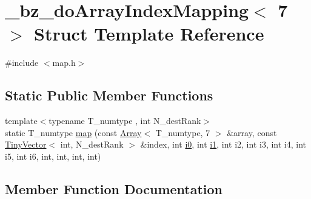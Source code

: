 \hypertarget{struct__bz__doArrayIndexMapping_3_017_01_4}{}\section{\+\_\+bz\+\_\+do\+Array\+Index\+Mapping$<$ 7 $>$ Struct Template Reference}
\label{struct__bz__doArrayIndexMapping_3_017_01_4}


{\ttfamily \#include $<$map.\+h$>$}

\subsection*{Static Public Member Functions}
\begin{DoxyCompactItemize}
\item 
{\footnotesize template$<$typename T\+\_\+numtype , int N\+\_\+dest\+Rank$>$ }\\static T\+\_\+numtype \hyperlink{struct__bz__doArrayIndexMapping_3_017_01_4_a9e91325248934553ee2462834711a629}{map} (const \hyperlink{classArray}{Array}$<$ T\+\_\+numtype, 7 $>$ \&array, const \hyperlink{classTinyVector}{Tiny\+Vector}$<$ int, N\+\_\+dest\+Rank $>$ \&index, int \hyperlink{cephes_8h_aacd2643d920288e61be16787561a4514}{i0}, int \hyperlink{cephes_8h_ab24474d03df1f9adf1700c2c1badd1a5}{i1}, int i2, int i3, int i4, int i5, int i6, int, int, int, int)
\end{DoxyCompactItemize}


\subsection{Member Function Documentation}
\hypertarget{struct__bz__doArrayIndexMapping_3_017_01_4_a9e91325248934553ee2462834711a629}{}

